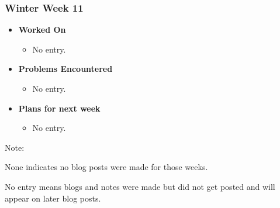 \documentclass[compsoc,draftclsnofoot,onecolumn,10pt]{IEEEtran}
\begin{document}
\subsubsection{Winter Week 11}
\begin{itemize}
    \item {\textbf{Worked On}}
    \begin{itemize}
      \item No entry.
    \end{itemize}

    \item {\textbf{Problems Encountered}}
    \begin{itemize}
      \item No entry.
    \end{itemize}

    \item{\textbf{Plans for next week}}
    \begin{itemize}
      \item No entry.
    \end{itemize}

\end{itemize}

Note:\par
None indicates no blog posts were made for those weeks.\par
No entry means blogs and notes were made but did not get posted and will
appear on later blog posts.
\end{document}

